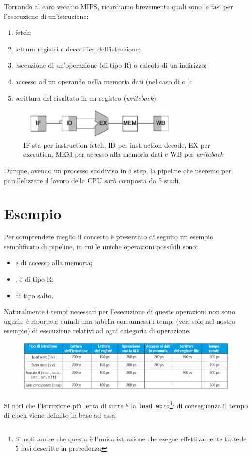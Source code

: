 \documentclass[class=book, crop=false, oneside]{standalone}
\begin{document}
Tornando al caro vecchio MIPS, ricordiamo brevemente quali sono le fasi per l'esecuzione di un'istruzione:
\begin{enumerate}[noitemsep]
	\item fetch;
	\item lettura registri e decodifica dell'istruzione;
	\item esecuzione di un'operazione (di tipo R) o calcolo di un indirizzo;
	\item accesso ad un operando nella memoria dati (nel caso di  o );
	\item scrittura del risultato in un registro (\emph{writeback}).
\end{enumerate}
\begin{figure}
	\centering
	\includegraphics[width=.5\textwidth,keepaspectratio]{istruzione.png}
	\caption{IF sta per instruction fetch, ID per instruction decode, EX per execution, MEM per accesso alla memoria dati e WB per \emph{writeback}}
\end{figure}
Dunque, avendo un processo suddiviso in 5 step, la pipeline che useremo per parallelizzare il lavoro della CPU sarà composta da 5 stadi.

\section{Esempio}
Per comprendere meglio il concetto è presentato di seguito un esempio semplificato di pipeline, in cui le uniche operazioni possibili sono:
\begin{itemize}
	\item {} e  di accesso alla memoria;
	\item {},  e  di tipo R;
	\item {} di tipo salto.
\end{itemize}
Naturalmente i tempi necessari per l'esecuzione di queste operazioni non sono uguali: è riportata quindi una tabella con annessi i tempi (veri solo nel nostro esempio) di esecuzione relativi ad ogni categoria di operazione.
\begin{figure}[H]
	\centering
	\includegraphics[width=\textwidth,keepaspectratio]{tabella-tempi-operazioni.png}
\end{figure}
Si noti che l'istruzione più lenta di tutte è la \texttt{load word}\footnote{Si noti anche che questa è l'unica istruzione che esegue effettivamente tutte le 5 fasi descritte in precedenza}: di conseguenza il tempo di clock viene definito in base ad essa.
\end{document}

